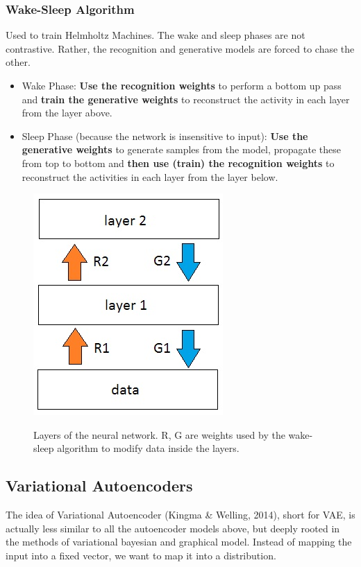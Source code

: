 \documentclass[main]{subfiles}
\begin{document}
\subsubsection{Wake-Sleep Algorithm}
Used to train Helmholtz Machines. The wake and sleep phases are not contrastive. Rather, the recognition and generative models are forced to chase the other.

\begin{itemize}
    \item Wake Phase: \textbf{Use the recognition weights} to perform a bottom up pass and \textbf{train the generative weights} to reconstruct the activity in each layer from the layer above.
    \item Sleep Phase (because the network is insensitive to input): \textbf{Use the generative weights} to generate samples from the model, propagate these from top to bottom and \textbf{then use (train) the recognition weights} to reconstruct the activities in each layer from the layer below.
\end{itemize}
 
 \begin{figure}[H]
	\centering
	\includegraphics[width=0.3\linewidth]{07_UnsupervisedAndSelfsupervisedLearning/figures/wake-sleep.jpg}
	\label{fig:wake-sleep}
	\caption{Layers of the neural network. R, G are weights used by the wake-sleep algorithm to modify data inside the layers.}
\end{figure}

\subsection{Variational Autoencoders}
The idea of Variational Autoencoder (Kingma & Welling, 2014), short for VAE, is actually less similar to all the autoencoder models above, but deeply rooted in the methods of variational bayesian and graphical model. Instead of mapping the input into a fixed vector, we want to map it into a distribution. 
\end{document}
